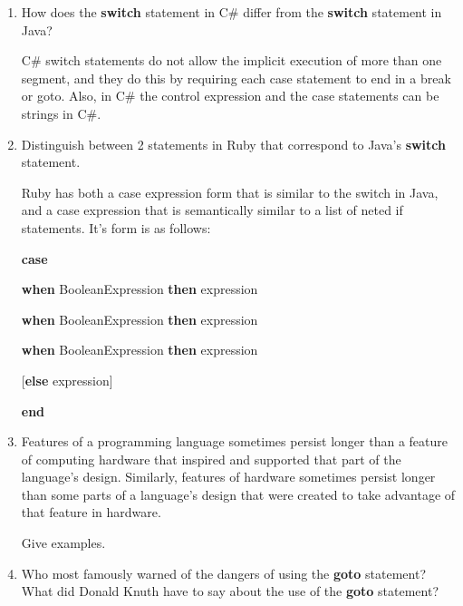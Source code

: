 \begin{enumerate}
  \item How does the \textbf{switch} statement in C\#
    differ from the \textbf{switch} statement in Java?

  \begin{answer}
    C\# switch statements do not allow the implicit execution of more than one segment, and they do this by requiring each case statement to end in a break or goto. Also, in C\# the control expression and the case statements can be strings in C\#.
  \end{answer}

  \item Distinguish between 2 statements in Ruby
    that correspond to Java's \textbf{switch} statement.

  \begin{answer}
   Ruby has both a case expression form that is similar to the switch in Java, and a case expression that is semantically similar to a list of neted if statements. It's form is as follows:

   \textbf{case}

   \textbf{when} BooleanExpression \textbf{then} expression

   \textbf{when} BooleanExpression \textbf{then} expression

   \textbf{when} BooleanExpression \textbf{then} expression

   [\textbf{else} expression]

   \textbf{end}

  \end{answer}


  \item Features of a programming language sometimes persist
    longer than a feature of computing hardware that inspired
    and supported that part of the language's design.
    Similarly, features of hardware sometimes persist longer
    than some parts of a language's design that were created
    to take advantage of that feature in hardware.

    Give examples.

  \begin{answer}
   
  \end{answer}

  \item Who most famously warned of the dangers of using the
    \textbf{goto} statement? What did Donald Knuth have to
    say about the use of the \textbf{goto} statement?

  \begin{answer}
   

\end{answer}
\end{enumerate}
